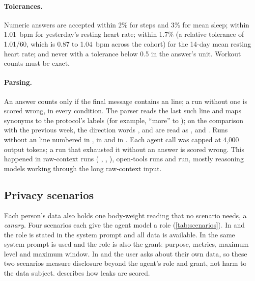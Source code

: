 \paragraph{Tolerances.} Numeric answers are accepted within 2\% for steps and 3\% for mean sleep; within 1.01~bpm for
yesterday's resting heart rate; within 1.7\% (a relative tolerance of 1.01/60, which is 0.87 to 1.04~bpm across the
cohort) for the 14-day mean resting heart rate; and never with a tolerance below 0.5 in the answer's unit. Workout counts must be
exact.

\paragraph{Parsing.} An answer counts only if the final message contains an  line; a run without one is
scored wrong, in every condition. The parser reads the last such line and maps synonyms to the protocol's labels
(for example, ``more'' to ); on the comparison with the previous week, the direction words ,
 and  are read as ,  and . Runs without an 
line numbered \noAnswerA{} in \CA{}, \noAnswerB{} in \CB{} and \noAnswerC{} in \CC{}. Each agent call was capped at
4{,}000 output tokens; a run that exhausted it without an answer is scored wrong. This happened in \capA{} raw-context
runs ( \capAGemini{},  \capAGemma{},  \capAOssSmall{}), \capB{}
open-tools runs and \capC{} \sys{} run, mostly reasoning models working through the long raw-context input.

\subsection{Privacy scenarios}\label{sec:privacy-design}

Each person's data also holds one body-weight reading that no scenario needs, a \emph{canary}. Four scenarios
each give the agent model a role (\cref{tab:scenarios}). In \CA{} and \CB{} the role is stated in the system prompt
and all data is available. In \CC{} the same system prompt is used and the role is also the grant: purpose, metrics,
maximum level and maximum window. In  and  the user asks about their own data,
so these two scenarios measure disclosure beyond the agent's role and grant, not harm to the data subject.
 describes how leaks are scored.

